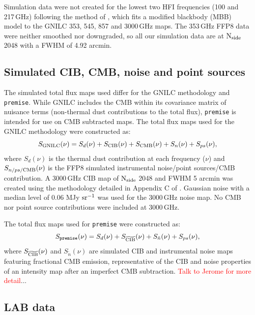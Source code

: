 \documentclass[a4paper,fleqn,usenatbib]{mnras}
\begin{document}
Simulation data were not created for the lowest two HFI frequencies (100 and 217\,GHz) following the method of \citep{gnilc}, which fits a modified blackbody (MBB) model to the GNILC 353, 545, 857 and 3000\,GHz maps. The 353\,GHz FFP8 data were neither smoothed nor downgraded, so all our simulation data are at $\rm{N_{side}}$ 2048 with a FWHM of 4.92 arcmin. 

\subsection{Simulated CIB, CMB, noise and point sources}

The simulated total flux maps used differ for the GNILC methodology and {\texttt{premise}}. While GNILC includes the CMB within its covariance matrix of nuisance terms (non-thermal dust contributions to the total flux), {\texttt{premise}} is intended for use on CMB subtracted maps. The total flux maps used for the GNILC methodology were constructed as: 
\begin{equation}
S_{\rm{GNILC}}(\nu) = S_{d}(\nu)  + S_{\rm{CIB}} (\nu) + S_{\rm{CMB}}(\nu)  +  S_{n}(\nu)  + S_{ps}(\nu),
\label{eq:gnilcTotS}
\end{equation}
where $S_{d}(\nu)$ is the thermal dust contribution at each frequency ($\nu$) and $S_{n/ps/\rm{CMB}}(\nu)$ is the FFP8 simulated instrumental noise/point sources/CMB contribution. A 3000\,GHz CIB map of $\rm{N_{side}}$ 2048 and FWHM 5 arcmin was created using the methodology detailed in Appendix C of \citet{pr2}. Gaussian noise with a median level of 0.06 MJy $\rm{sr}^{-1}$ \citep{pr2} was used for the 3000\,GHz noise map. No CMB nor point source contributions were included at 3000\,GHz.  

The total flux maps used for {\texttt{premise}} were constructed as: 
\begin{equation}
S_{\rm{{\texttt{premise}}}}(\nu) = S_{d}(\nu)  + S_{\rm{\widetilde{CIB}}} (\nu) +  S_{\tilde{n}}(\nu)  + S_{ps}(\nu), 
\label{eq:waveTotS}
\end{equation}
where $S_{\rm{\widetilde{CIB}}} (\nu) $ and $S_{\tilde{n}}(\nu) $ are simulated CIB and instrumental noise maps featuring fractional CMB emission, representative of the CIB and noise properties of an intensity map after an imperfect CMB subtraction.  \textcolor{red}{Talk to Jerome for more detail}...

\subsection{LAB data}
\end{document}
